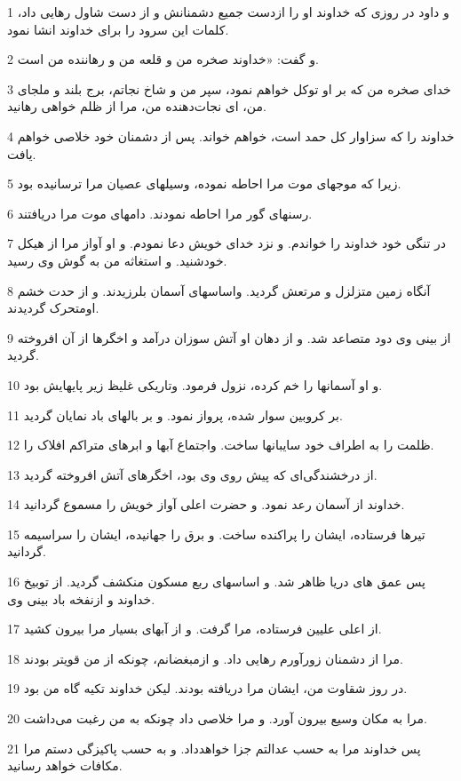 \par 1 و داود در روزی که خداوند او را ازدست جمیع دشمنانش و از دست شاول رهایی داد، کلمات این سرود را برای خداوند انشا نمود.
\par 2 و گفت: «خداوند صخره من و قلعه من و رهاننده من است.
\par 3 خدای صخره من که بر او توکل خواهم نمود، سپر من و شاخ نجاتم، برج بلند و ملجای من، ای نجات‌دهنده من، مرا از ظلم خواهی رهانید.
\par 4 خداوند را که سزاوار کل حمد است، خواهم خواند. پس از دشمنان خود خلاصی خواهم یافت.
\par 5 زیرا که موجهای موت مرا احاطه نموده، وسیلهای عصیان مرا ترسانیده بود. 
\par 6 رسنهای گور مرا احاطه نمودند. دامهای موت مرا دریافتند.
\par 7 در تنگی خود خداوند را خواندم. و نزد خدای خویش دعا نمودم. و او آواز مرا از هیکل خودشنید. و استغاثه من به گوش وی رسید.
\par 8 آنگاه زمین متزلزل و مرتعش گردید. واساسهای آسمان بلرزیدند. و از حدت خشم اومتحرک گردیدند.
\par 9 از بینی وی دود متصاعد شد. و از دهان او آتش سوزان درآمد و اخگرها از آن افروخته گردید.
\par 10 و او آسمانها را خم کرده، نزول فرمود. وتاریکی غلیظ زیر پایهایش بود.
\par 11 بر کروبین سوار شده، پرواز نمود. و بر بالهای باد نمایان گردید.
\par 12 ظلمت را به اطراف خود سایبانها ساخت. واجتماع آبها و ابرهای متراکم افلاک را.
\par 13 از درخشندگی‌ای که پیش روی وی بود، اخگرهای آتش افروخته گردید.
\par 14 خداوند از آسمان رعد نمود. و حضرت اعلی آواز خویش را مسموع گردانید.
\par 15 تیرها فرستاده، ایشان را پراکنده ساخت. و برق را جهانیده، ایشان را سراسیمه گردانید.
\par 16 پس عمق های دریا ظاهر شد. و اساسهای ربع مسکون منکشف گردید. از توبیخ خداوند و ازنفخه باد بینی وی.
\par 17 از اعلی علیین فرستاده، مرا گرفت. و از آبهای بسیار مرا بیرون کشید.
\par 18 مرا از دشمنان زورآورم رهایی داد. و ازمبغضانم، چونکه از من قویتر بودند.
\par 19 در روز شقاوت من، ایشان مرا دریافته بودند. لیکن خداوند تکیه گاه من بود.
\par 20 مرا به مکان وسیع بیرون آورد. و مرا خلاصی داد چونکه به من رغبت می‌داشت.
\par 21 پس خداوند مرا به حسب عدالتم جزا خواهدداد. و به حسب پاکیزگی دستم مرا مکافات خواهد رسانید.
